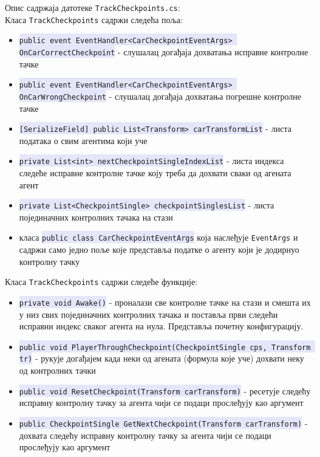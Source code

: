 \documentclass[12pt]{article}
\newcommand{\mycode}[1]{\texttt{\colorbox{Lavender}{#1}}}
\begin{document}
\vspace{0.5cm}
Опис садржаја датотеке \texttt{TrackCheckpoints.cs}:\\
Класа \texttt{TrackCheckpoints} садржи следећа поља: 
\begin{itemize}
  \item \mycode{public event EventHandler<CarCheckpointEventArgs> OnCarCorrectCheckpoint} - слушалац догађаја дохватања исправне контролне тачке
  \item \mycode{public event EventHandler<CarCheckpointEventArgs> OnCarWrongCheckpoint} - слушалац догађаја дохватања погрешне контролне тачке
  \item \mycode{[SerializeField] public List<Transform> carTransformList} - листа података о свим агентима који уче
  \item \mycode{private List<int> nextCheckpointSingleIndexList} - листа индекса следеће исправне контролне тачке коју треба да дохвати сваки од агената агент 
  \item \mycode{private List<CheckpointSingle> checkpointSinglesList} - листа појединачних контролних тачака на стази 
  \item класа \mycode{public class CarCheckpointEventArgs} која наслеђује \texttt{EventArgs} и садржи само једно поље које представља податке о агенту који је додирнуо контролну тачку
\end{itemize}
\vspace{0.5cm}
Класа \texttt{TrackCheckpoints} садржи следеће функције: 
\begin{itemize}
  \item \mycode{private void Awake()} - проналази све контролне тачке на стази и смешта их у низ свих појединачних контролних тачака и поставља први следећи исправни индекс сваког агента на нула. Представља почетну конфигурацију.
  \item \mycode{public void PlayerThroughCheckpoint(CheckpointSingle cps, Transform tr)} - рукује догађајем када неки од агената (формула које уче) дохвати неку од контролних тачки
  \item \mycode{public void ResetCheckpoint(Transform carTransform)} - ресетује следећу исправну контролну тачку за агента чији се подаци прослеђују као аргумент
  \item \mycode{public CheckpointSingle GetNextCheckpoint(Transform carTransform)} - дохвата следећу исправну контролну тачку за агента чији се подаци прослеђују као аргумент
\end{itemize}
\end{document}
